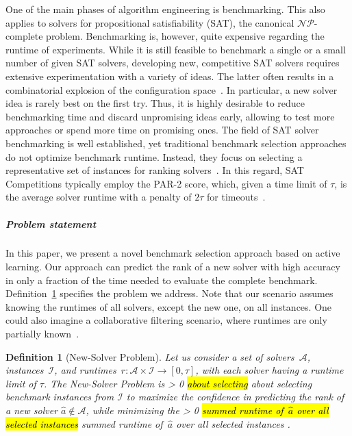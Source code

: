 \documentclass[sn-basic, Numbered]{sn-jnl} %
\newtheorem{definition}{Definition} %
\newcommand{\showchanges}{1} %
\newcommand{\change}[1]{\ifnum \showchanges > 0 \sethlcolor{yellow}\hl{#1} \else #1 \fi}
\begin{document}
One of the main phases of algorithm engineering is benchmarking.
This also applies to solvers for propositional satisfiability (SAT), the canonical $\mathcal{NP}$-complete problem.
Benchmarking is, however, quite expensive regarding the runtime of experiments.
While it is still feasible to benchmark a single or a small number of given SAT solvers, developing new, competitive SAT solvers requires extensive experimentation with a variety of ideas.
The latter often results in a combinatorial explosion of the configuration space~\cite{HutterHL11}.
In particular, a new solver idea is rarely best on the first try.
Thus, it is highly desirable to reduce benchmarking time and discard unpromising ideas early, allowing to test more approaches or spend more time on promising ones.
The field of SAT solver benchmarking is well established, yet traditional benchmark selection approaches do not optimize benchmark runtime.
Instead, they focus on selecting a representative set of instances for ranking solvers~\cite{Gelder11,HoosKSS13}.
In this regard, SAT Competitions typically employ the \mbox{PAR-2} score, which, given a time limit of $\tau$, is the average solver runtime with a penalty of $2 \tau$ for timeouts~\cite{FroleyksHIJS21}.

\subparagraph{Problem statement}

In this paper, we present a novel benchmark selection approach based on active learning.
Our approach can predict the rank of a new solver with high accuracy in only a fraction of the time needed to evaluate the complete benchmark.
Definition~\ref{def:new-solver-problem} specifies the problem we address.
Note that our scenario assumes knowing the runtimes of all solvers, except the new one, on all instances.
One could also imagine a collaborative filtering scenario, where runtimes are only partially known~\cite{misir2017data,misir2017alors}.

\begin{definition}[New-Solver Problem]
  Let us consider a set of solvers~$\mathcal{A}$, instances~$\mathcal{I}$, and runtimes~${r\!: \mathcal{A} \times \mathcal{I} \rightarrow \left[0, \tau\right]}$, with each solver having a runtime limit of $\tau$.
  The \emph{New-Solver Problem} is \change{about selecting} benchmark instances from $\mathcal{I}$ to maximize the confidence in predicting the rank of a new solver $\hat{a} \notin \mathcal{A}$, while minimizing the \change{summed runtime of~$\hat{a}$ over all selected instances}.
  \label{def:new-solver-problem}
\end{definition}
\end{document}

